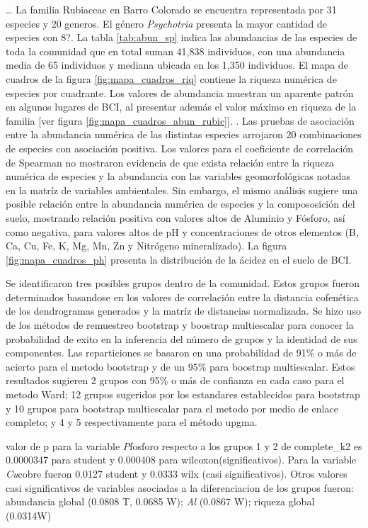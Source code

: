 \documentclass[11pt,]{article}
\begin{document}
\dots
La familia Rubiaceae en Barro Colorado se encuentra representada por 31
especies y 20 generos. El género \emph{Psychotria} presenta la mayor
cantidad de especies con 8?. La tabla \ref{tab:abun_sp} indica las
abundancias de las especies de toda la comunidad que en total suman
41,838 individuos, con una abundancia media de 65 individuos y mediana
ubicada en los 1,350 individuos. El mapa de cuadros de la figura
\ref{fig:mapa_cuadros_riq} contiene la riqueza numérica de especies por
cuadrante. Los valores de abundancia muestran un aparente patrón en
algunos lugares de BCI, al presentar además el valor máximo en riqueza
de la familia {[}ver figura \ref{fig:mapa_cuadros_abun_rubic}{]}. . Las
pruebas de asociación entre la abundancia numérica de las distintas
especies arrojaron 20 combinaciones de especies con asociación positiva.
Los valores para el coeficiente de correlación de Spearman no mostraron
evidencia de que exista relación entre la riqueza numérica de especies y
la abundancia con las variables geomorfológicas notadas en la matríz de
variables ambientales. Sin embargo, el mismo análisis sugiere una
posible relación entre la abundancia numérica de especies y la
compososición del suelo, mostrando relación positiva con valores altos
de Aluminio y Fósforo, así como negativa, para valores altos de pH y
concentraciones de otros elementos (B, Ca, Cu, Fe, K, Mg, Mn, Zn y
Nitrógeno mineralizado). La figura \ref{fig:mapa_cuadros_ph} presenta la
distribución de la ácidez en el suelo de BCI.

Se identificaron tres posibles grupos dentro de la comunidad. Estos
grupos fueron determinados basandose en los valores de correlación entre
la distancia cofenética de los dendrogramas generados y la matríz de
distancias normalizada. Se hizo uso de los métodos de remuestreo
bootstrap y boostrap multiescalar para conocer la probabilidad de exito
en la inferencia del número de grupos y la identidad de sus componentes.
Las reparticiones se basaron en una probabilidad de 91\% o más de
acierto para el metodo bootstrap y de un 95\% para boostrap
multiescalar. Estos resultados sugieren 2 grupos con 95\% o más de
confianza en cada caso para el metodo Ward; 12 grupos sugeridos por los
estandares establecidos para bootstrap y 10 grupos para bootstrap
multiescalar para el metodo por medio de enlace completo; y 4 y 5
respectivamente para el método upgma.

valor de p para la variable \emph{P}fosforo respecto a los grupos 1 y 2
de complete\_k2 es 0.0000347 para student y 0.000408 para
wilcoxon(significativos). Para la variable \emph{Cu}cobre fueron 0.0127
student y 0.0333 wilx (casi significativos). Otros valores casi
significativos de variables asociadas a la diferenciacion de los grupos
fueron: abundancia global (0.0808 T, 0.0685 W); \emph{Al} (0.0867 W);
riqueza global (0.0314W)
\end{document}
